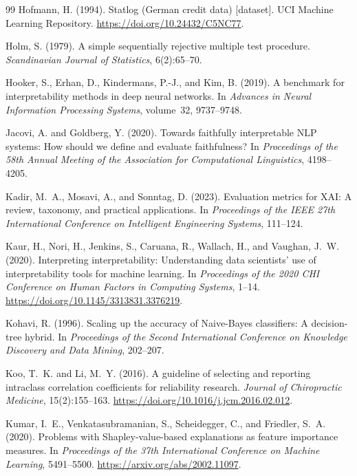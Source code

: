 \documentclass[10pt,a4paper,twoside]{article}
\begin{document}
\begin{thebibliography}{99}
Hofmann, H. (1994).
Statlog ({German} credit data) [dataset].
UCI Machine Learning Repository.
\url{https://doi.org/10.24432/C5NC77}.

Holm, S. (1979).
A simple sequentially rejective multiple test procedure.
\emph{Scandinavian Journal of Statistics}, 6(2):65--70.

Hooker, S., Erhan, D., Kindermans, P.-J., and Kim, B. (2019).
A benchmark for interpretability methods in deep neural networks.
In \emph{Advances in Neural Information Processing Systems}, volume~32,
9737--9748.

Jacovi, A. and Goldberg, Y. (2020).
Towards faithfully interpretable {NLP} systems: How should we define and
evaluate faithfulness?
In \emph{Proceedings of the 58th Annual Meeting of the Association for
Computational Linguistics}, 4198--4205.

Kadir, M.~A., Mosavi, A., and Sonntag, D. (2023).
Evaluation metrics for XAI: A review, taxonomy, and practical applications.
In \emph{Proceedings of the IEEE 27th International Conference on
Intelligent Engineering Systems}, 111--124.

Kaur, H., Nori, H., Jenkins, S., Caruana, R., Wallach, H., and
Vaughan, J.~W. (2020).
Interpreting interpretability: Understanding data scientists' use of
interpretability tools for machine learning.
In \emph{Proceedings of the 2020 {CHI} Conference on Human Factors in
Computing Systems}, 1--14.
\url{https://doi.org/10.1145/3313831.3376219}.

Kohavi, R. (1996).
Scaling up the accuracy of Naive-Bayes classifiers: A decision-tree hybrid.
In \emph{Proceedings of the Second International Conference on Knowledge
Discovery and Data Mining}, 202--207.

Koo, T.~K. and Li, M.~Y. (2016).
A guideline of selecting and reporting intraclass correlation coefficients
for reliability research.
\emph{Journal of Chiropractic Medicine}, 15(2):155--163.
\url{https://doi.org/10.1016/j.jcm.2016.02.012}.

Kumar, I.~E., Venkatasubramanian, S., Scheidegger, C., and
Friedler, S.~A. (2020).
Problems with {Shapley}-value-based explanations as feature importance
measures.
In \emph{Proceedings of the 37th International Conference on Machine
Learning}, 5491--5500.
\url{https://arxiv.org/abs/2002.11097}.


\end{thebibliography}
\end{document}
